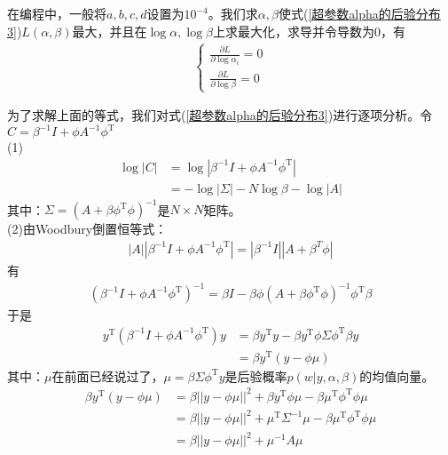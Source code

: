         在编程中，一般将$a,b,c,d$设置为$10^{-4}$。我们求$\alpha,\beta$使式(\ref{超参数alpha的后验分布3})$L(\alpha,\beta)$最大，并且在$\log \alpha,\log \beta$上求最大化，求导并令导数为0，有
        \begin{align*}
        \left\{
        \begin{aligned}
        \frac{\partial L}{\partial \log \alpha_i} = 0\\
        \frac{\partial L}{\partial \log \beta} = 0
        \end{aligned}
        \right.
        \end{align*}
        \par
        为了求解上面的等式，我们对式(\ref{超参数alpha的后验分布3})进行逐项分析。令$C = \beta^{-1}I+\phi A^{-1}\phi^\mathrm{T} $\\
        (1)
        \begin{align*}
        \log |C| &= \log |\beta^{-1}I+\phi A^{-1}\phi^\mathrm{T}| \\
        &= -\log |\Sigma| - N\log \beta - \log|A|
        \end{align*}
        其中：$\Sigma = (A+\beta \phi^{\mathrm{T}}\phi)^{-1}$是$N\times N$矩阵。\\
        (2)由Woodbury倒置恒等式：
        \begin{align*}
        |A| |\beta^{-1}I+\phi A^{-1}\phi^\mathrm{T}| = |\beta^{-1}I||A+\beta^{T}\phi|
        \end{align*}
        有
        \begin{align*}
        (\beta^{-1}I+\phi A^{-1}\phi^\mathrm{T})^{-1} = \beta I - \beta \phi(A+\beta \phi^\mathrm{T}\phi)^{-1}\phi^\mathrm{T}\beta
        \end{align*}
        于是
        \begin{align*}
        y^\mathrm{T} (\beta^{-1}I+\phi A^{-1}\phi^\mathrm{T}) y &= \beta y^\mathrm{T}y - \beta y^\mathrm{T}\phi \Sigma \phi^{\mathrm{T}} \beta y \\
        &=\beta y^\mathrm{T}(y - \phi \mu)
        \end{align*}
        其中：$\mu$在前面已经说过了，$\mu = \beta \Sigma \phi^\mathrm{T}y$是后验概率$p(w|y,\alpha,\beta)$的均值向量。
        \begin{align*}
        \beta y^\mathrm{T}( y -\phi \mu) &= \beta||y-\phi \mu||^2 + \beta y^\mathrm{T}\phi \mu - \beta\mu^\mathrm{T}\phi^\mathrm{T}\phi \mu\\
        &=\beta ||y-\phi \mu||^2 + \mu^\mathrm{T}\Sigma^{-1}\mu -\beta \mu^\mathrm{T}\phi^\mathrm{T}\phi \mu\\
        & = \beta||y-\phi \mu||^2 + \mu^{-1}A\mu
        \end{align*}
